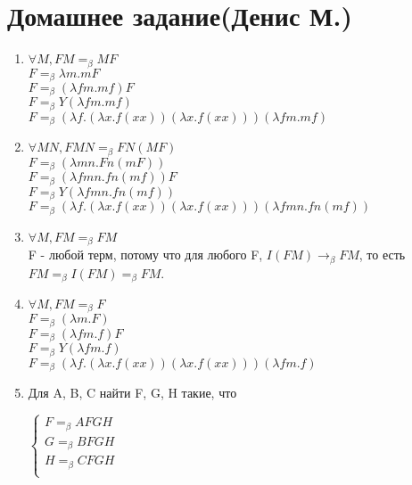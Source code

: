 \documentclass[fontsize=14pt, paper=a4, pagesize, DIV=calc]{article}
\begin{document}
\section{Домашнее задание(Денис М.)}

\begin{enumerate}

\item 
$\forall M, F M =_{\beta} M F$ \\
$F =_{\beta} \lambda m . m F$ \\
$F =_{\beta} (\lambda f m . m f) F$ \\
$F =_{\beta} Y (\lambda f m . m f)$ \\
$F =_{\beta} (\lambda f . (\lambda x . f (x x)) (\lambda x . f (x x))) (\lambda f m . m f)$ \\

\item
$\forall M N, F M N =_{\beta} F N (M F)$ \\
$F =_{\beta} (\lambda m n . F n (m F))$ \\
$F =_{\beta} (\lambda f m n . f n (m f)) F$ \\
$F =_{\beta} Y (\lambda f m n . f n (m f))$ \\
$F =_{\beta} (\lambda f . (\lambda x . f (x x)) (\lambda x . f (x x))) (\lambda f m n . f n (m f))$ \\

\item
$\forall M, F M =_{\beta} F M$ \\
F - любой терм, потому что для любого F, $I(F M) \rightarrow_{\beta} F M$, то
есть $F M =_{\beta} I (F M) =_{\beta} F M$.

\item
$\forall M, F M =_{\beta} F$ \\
$F =_{\beta} (\lambda m . F)$ \\
$F =_{\beta} (\lambda f m . f) F$ \\
$F =_{\beta} Y (\lambda f m . f)$ \\
$F =_{\beta} (\lambda f . (\lambda x . f (x x)) (\lambda x . f (x x))) (\lambda f m . f)$ \\

\item Для A, B, C найти F, G, H такие, что

$
\begin{cases} 
    F =_{\beta} A F G H \\ 
    G =_{\beta} B F G H \\ 
    H =_{\beta} C F G H \\ 
\end{cases}
$


\end{enumerate}
\end{document}
